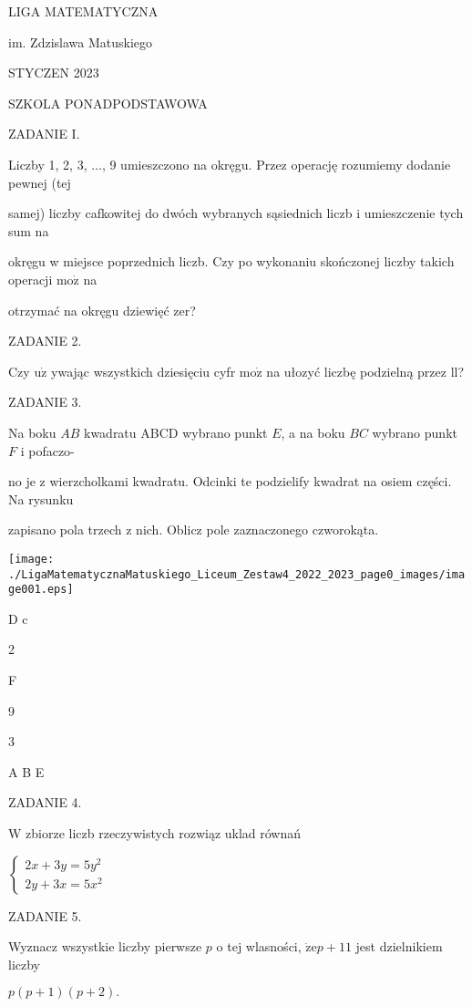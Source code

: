 \documentclass[a4paper,12pt]{article}
\begin{document}
LIGA MATEMATYCZNA

im. Zdzislawa Matuskiego

STYCZEN 2023

SZKOLA PONADPODSTAWOWA

ZADANIE I.

Liczby 1, 2, 3, $\ldots$, 9 umieszczono na okręgu. Przez operację rozumiemy dodanie pewnej (tej

samej) liczby cafkowitej do dwóch wybranych sąsiednich liczb i umieszczenie tych sum na

okręgu w miejsce poprzednich liczb. Czy po wykonaniu skończonej liczby takich operacji $\mathrm{m}\mathrm{o}\dot{\mathrm{z}}$ na

otrzymać na okręgu dziewięć zer?

ZADANIE 2.

Czy $\mathrm{u}\dot{\mathrm{z}}$ ywając wszystkich dziesięciu cyfr $\mathrm{m}\mathrm{o}\dot{\mathrm{z}}$ na ułozyć liczbę podzielną przez ll?

ZADANIE 3.

Na boku $AB$ kwadratu ABCD wybrano punkt $E$, a na boku $BC$ wybrano punkt $F$ i pofaczo-

no je z wierzcholkami kwadratu. Odcinki te podzielify kwadrat na osiem części. Na rysunku

zapisano pola trzech z nich. Oblicz pole zaznaczonego czworokąta.
\begin{center}
\texttt{[image: ./LigaMatematycznaMatuskiego\_Liceum\_Zestaw4\_2022\_2023\_page0\_images/image001.eps]}
\end{center}
D  c

2

F

9

3

A  B  E

ZADANIE 4.

$\mathrm{W}$ zbiorze liczb rzeczywistych rozwiąz uklad równań

$\left\{\begin{array}{l}
2x+3y=5y^{2}\\
2y+3x=5x^{2}
\end{array}\right.$

ZADANIE 5.

Wyznacz wszystkie liczby pierwsze $p$ o tej wlasności, $\dot{\mathrm{z}}\mathrm{e}p+11$ jest dzielnikiem liczby

$p(p+1)(p+2).$
\end{document}
